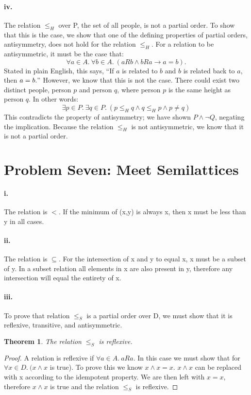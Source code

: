 \documentclass[10pt,letter]{article}
\newtheorem*{thm}{Theorem}
\begin{document}
\paragraph{iv.} The relation $\leq_H$ over P, the set of all people, is not a partial order. To show that this is the case, we show that one of the defining properties of partial orders, antisymmetry, does not hold for the relation $\leq_H$. For a relation to be antisymmetric, it must be the case that:
$$\forall a \in A.\ \forall b \in A.\ (aRb \wedge bRa \rightarrow a=b).$$
Stated in plain English, this says, ``If $a$ is related to $b$ and $b$ is related back to $a$, then $a = b."$ However, we know that this is not the case. There could exist two distinct people, person $p$ and person $q$, where person $p$ is the same height as person $q$. In other words:
$$\exists p \in P.\ \exists q \in P.\ (p \leq_H q \wedge q \leq_H p \wedge p \neq q)$$
This contradicts the property of antisymmetry; we have shown $P \wedge \neg Q$, negating the implication. Because the relation $\leq_H$ is not antisymmetric, we know that it is not a partial order.

\section*{Problem Seven: Meet Semilattices}

\paragraph{i.} The relation is $<$. If the minimum of (x,y) is always x, then x must be less than y in all cases. 
\paragraph{ii.} The relation is $\subseteq$. For the intersection of x and y to equal x, x must be a subset of y. In a subset relation all elements in x are also present in y, therefore any intersection will equal the entirety of x. 
\paragraph{iii.} 
To prove that relation $\le_S$ is a partial order over D, we must show that it is reflexive, transitive, and antisymmetric.\\
 
\begin{thm} The relation $\le_S$ is reflexive. \end{thm}
\begin{proof} 
A relation is reflexive if  $\forall a \in A. \> aRa.$  In this case we must show that for $\forall x \in D. \ (x \wedge x$ is true). To prove this we know $x \wedge x = x$. $x \wedge x$ can be replaced with x according to the idempotent property. We are then left with $x = x$, therefore $x \wedge x$ is true and the relation $\le_S$ is reflexive.
\end{proof}
\end{document}
